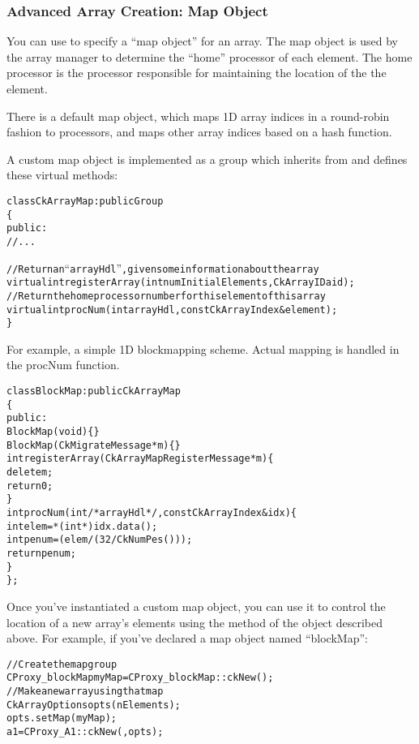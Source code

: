\subsubsection{Advanced Array Creation: Map Object}
\label{array map}

You can use  to specify a ``map object''
for an array.  The map object is used by the array manager
to determine the ``home'' processor of each element.  The
home processor is the processor responsible for maintaining
the location of the the element.

There is a default map object, which maps 1D array indices
in a round-robin fashion to processors, and maps other array
indices based on a hash function.

A custom map object is implemented as a group which inherits from
 and defines these virtual methods:

\begin{alltt}
class CkArrayMap : public Group
\{
public:
  //...
  
  //Return an ``arrayHdl'', given some information about the array
  virtual int registerArray(int numInitialElements,CkArrayID aid);
  //Return the home processor number for this element of this array
  virtual int procNum(int arrayHdl,const CkArrayIndex &element);
\}
\end{alltt}

For example, a simple 1D blockmapping scheme.  Actual mapping is
handled in the procNum function.

\begin{alltt}
class BlockMap : public CkArrayMap 
\{
 public:
  BlockMap(void) \{\}
  BlockMap(CkMigrateMessage *m)\{\}
  int registerArray(CkArrayMapRegisterMessage *m) \{
    delete m;
    return 0;
  \}
  int procNum(int /*arrayHdl*/,const CkArrayIndex &idx) \{
    int elem=*(int *)idx.data();
    int penum =  (elem/(32/CkNumPes()));
    return penum;
  \}
\};

\end{alltt}
Once you've instantiated a custom map object, you can use it to
control the location of a new array's elements using the
 method of the  object described above.
For example, if you've declared a map object named ``blockMap'':

\begin{alltt}
//Create the map group
  CProxy_blockMap myMap=CProxy_blockMap::ckNew();
//Make a new array using that map
  CkArrayOptions opts(nElements);
  opts.setMap(myMap);
  a1=CProxy_A1::ckNew(,opts);
\end{alltt}



